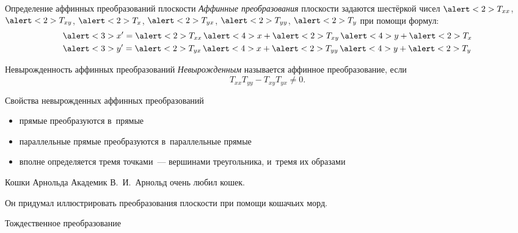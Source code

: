 	{}

\begin{frame}{Определение аффинных преобразований плоскости}
\emph{Аффинные преобразования} плоскости задаются шестёркой чисел $\alert<2>{T_{xx}}$,
$\alert<2>{T_{xy}}$, $\alert<2>{T_x}$, $\alert<2>{T_{yx}}$,
$\alert<2>{T_{yy}}$, $\alert<2>{T_y}$ при помощи формул:
{\LARGE
	\[
	\begin{aligned}
	&\alert<3>{x'}=\alert<2>{T_{xx}}\,\alert<4>{x}+\alert<2>{T_{xy}}\,\alert<4>{y}+\alert<2>{T_x}\\
	&\alert<3>{y'}=\alert<2>{T_{yx}}\,\alert<4>{x}+\alert<2>{T_{yy}}\,\alert<4>{y}+\alert<2>{T_y}
	\end{aligned}
	\]
}

\end{frame}

\begin{frame}{Невырожденность аффинных преобразований}
\emph{Невырожденным} называется аффинное преобразование, если
{\LARGE
	\[
	T_{xx}T_{yy}-T_{xy}T_{yx}\ne0.
	\]
}
\end{frame}

\begin{frame}{Свойства невырожденных аффинных преобразований}
\begin{itemize}
\item
прямые преобразуются в~прямые
\item
параллельные прямые преобразуются в~параллельные прямые
\item
вполне определяется тремя точками~— вершинами треугольника, и~тремя их образами
\end{itemize}
\end{frame}

\begin{frame}{Кошки Арнольда}
Академик В.~И.~Арнольд очень любил кошек.

Он придумал иллюстрировать преобразования плоскости при помощи кошачьих морд.
\bigskip
\begin{center}
%
%
\end{center}
\end{frame}

\begin{frame}{Тождественное преобразование}
\begin{center}
\LARGE
{}\\[4ex]
%
\end{center}
\end{frame}

